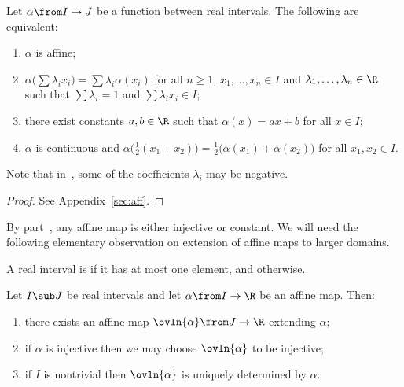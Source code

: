 \begin{lemma}
Let $\alpha \from I \to J$ be a function between real intervals.  The
following are equivalent: 
% 
\begin{enumerate}
\item
{}
$\alpha$ is affine;

\item
{}
$\alpha\bigl( \sum \lambda_i x_i \bigr) = \sum \lambda_i \alpha(x_i)$ for
all $n \geq 1$, $x_1, \ldots, x_n \in I$ and $\lambda_1, \ldots,
\lambda_n \in \R$ such that $\sum \lambda_i = 1$ and $\sum \lambda_i x_i
\in I$;

\item 
{}
there exist constants $a, b \in \R$ such that $\alpha(x) = ax + b$ for all
$x \in I$; 

\item
{}
$\alpha$ is continuous and $\alpha\bigl(\tfrac{1}{2}(x_1 + x_2)\bigr) =
\tfrac{1}{2}\bigl(\alpha(x_1) + \alpha(x_2)\bigr)$ for all $x_1, x_2 \in I$.
\end{enumerate}
\end{lemma}

Note that in~, some of the coefficients $\lambda_i$ may
be negative.

\begin{proof}
See Appendix~\ref{sec:aff}.
\end{proof}

By part~, any affine map is either
injective or constant.  We will need the following elementary observation
on extension of affine maps to larger domains.  

\begin{defn}
A real interval is %
% 
% 
if it has at most one element, and %
% 
% 
otherwise.
\end{defn}

\begin{lemma}
Let $I \sub J$ be real intervals and let $\alpha \from I \to \R$ be an
affine map.  Then:
% 
\begin{enumerate}
\item 
{}
there exists an affine map $\ovln{\alpha} \from J \to \R$ extending
$\alpha$;

\item
{}
if $\alpha$ is injective then we may choose $\ovln{\alpha}$ to be
injective;

\item
{}
if $I$ is nontrivial then $\ovln{\alpha}$ is uniquely determined by
$\alpha$.
\end{enumerate}
\end{lemma}

